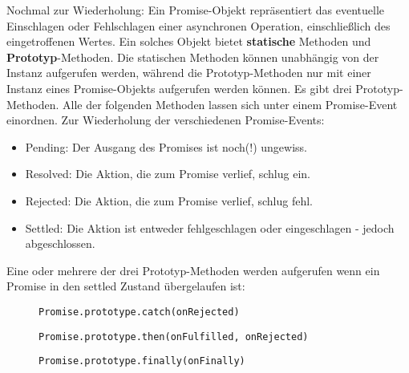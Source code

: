 Nochmal zur Wiederholung: Ein Promise-Objekt repräsentiert das eventuelle Einschlagen oder Fehlschlagen einer asynchronen Operation, einschließlich des eingetroffenen Wertes. Ein solches Objekt bietet \textbf{statische} Methoden und \textbf{Prototyp}-Methoden. Die statischen Methoden können unabhängig von der Instanz aufgerufen werden, während die Prototyp-Methoden nur mit einer Instanz eines Promise-Objekts aufgerufen werden können. Es gibt drei Prototyp-Methoden. Alle der folgenden Methoden lassen sich unter einem Promise-Event einordnen.
Zur Wiederholung der verschiedenen Promise-Events:

\begin{itemize} 
\item Pending: Der Ausgang des Promises ist noch(!) ungewiss.
\item Resolved: Die Aktion, die zum Promise verlief, schlug ein.
\item Rejected: Die Aktion, die zum Promise verlief, schlug fehl.
\item Settled: Die Aktion ist entweder fehlgeschlagen oder eingeschlagen - jedoch abgeschlossen.
\end{itemize}

\noindent
Eine oder mehrere der drei Prototyp-Methoden werden aufgerufen wenn ein Promise in den settled Zustand übergelaufen ist:

\begin{description}

\begin{figure}[H]
\item \begin{lstlisting}
Promise.prototype.catch(onRejected)
\end{lstlisting}
\end{figure}

\begin{figure}[H]
\item \begin{lstlisting}
Promise.prototype.then(onFulfilled, onRejected)
\end{lstlisting}
\end{figure}
 
\begin{figure}[H]
\item \begin{lstlisting} 
Promise.prototype.finally(onFinally)
\end{lstlisting}
\end{figure}
 
\end{description}

